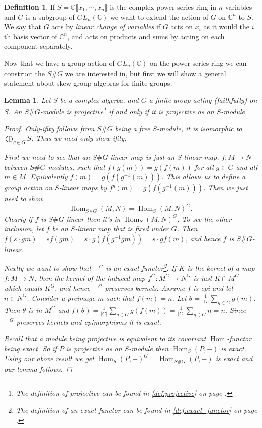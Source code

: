 \documentclass[11pt, a4paper, english]{article}
\newtheorem{lemma}[theorem]{Lemma}
\theoremstyle{definition}
\newtheorem{defin}[theorem]{Definition}
\newcommand{\C}{\mathbb{C}}
\DeclareMathOperator{\Hom}{Hom}
\begin{document}
\begin{defin}
If $S = \C \llbracket x_1, \cdots, x_n \rrbracket$ is the complex power series ring in $n$ variables and $G$ is a subgroup of $GL_n(\C)$ we want to extend the action of $G$ on $\C^n$ to $S$. We say that $G$ acts by \textit{linear change of variables} if $G$ acts on $x_i$ as it would the $i$th basis vector of $\C^n$, and acts on products and sums by acting on each component separately. 
\end{defin}

Now that we have a group action of $GL_n(\C)$ on the power series ring we can construct the $S\#G$ we are interested in, but first we will show a general statement about skew group algebras for finite groups.

\begin{lemma}
\label{lem:S proj => SG proj}
Let $S$ be a complex algerba, and $G$ a finite group acting (faithfully) on $S$. An $S\#G$-module is projective\footnote{The definition of projective can be found in \cref{def:projective} on page \pageref{def:projective}.} if and only if it is projective as an $S$-module.

\begin{proof}
Only-ifity follows from $S\#G$ being a free $S$-module, it is isomorphic to $\bigoplus_{g \in G} S$. Thus we need only show ifity.

First we need to see that an $S\#G$-linear map is just an $S$-linear map, $f: M \to N$ between $S\#G$-modules, such that $f(g(m))=g(f(m))$ for all $g \in G$ and all $m \in M$. Equivalently $f(m) = g(f(g^{-1}(m)))$. This allows us to define a group action on $S$-linear maps by $f^g(m) = g(f(g^{-1}(m)))$. Then we just need to show $$ \Hom_{S\#G}(M,N) = \Hom_S(M,N)^G.$$
Clearly if $f$ is $S\#G$-linear then it's in $\Hom_S(M,N)^G$. To see the other inclusion, let $f$ be an $S$-linear map that is fixed under $G$. Then $f(s\cdot g m) = s f(g m) = s\cdot g(f(g^{-1} g m)) = s \cdot g f(m) $, and hence $f$ is $S\#G$-linear.

Nextly we want to show that $-^G$ is an exact functor\footnote{The definition of an exact functor can be found in \cref{def:exact_functor} on page \pageref{def:exact_functor}.}. If $K$ is the kernel of a map $f: M \to N$, then the kernel of the induced map $f^G : M^G \to N^G$ is just $K \cap M^G$ which equals $K^G$, and hence $-^G$ preserves kernels. Assume $f$ is epi and let $n \in N^G$. Consider a preimage $m$ such that $f(m)=n$. Let $\theta = \frac{1}{|G|}\sum_{g \in G} g(m)$. Then $\theta$ is in $M^G$ and $f(\theta) = \frac{1}{|G|}\sum_{g \in G} g(f(m)) = \frac{1}{|G|}\sum_{g \in G} n = n$. Since $-^G$ preserves kernels and epimorphisms it is exact.

Recall that a module being projective is equivalent to its covariant $\Hom$-functor being exact. So if $P$ is projective as an $S$-module then $\Hom_S(P, -)$ is exact. Using our above result we get $\Hom_S(P, -)^G = \Hom_{S\#G}(P, -)$ is exact and our lemma follows.
\end{proof}
\end{lemma}
\end{document}

